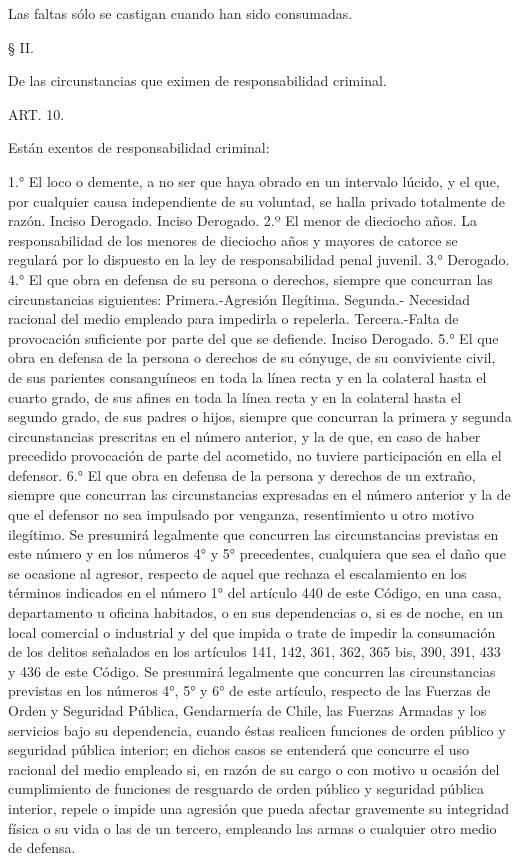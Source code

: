     Las faltas sólo se castigan cuando han sido consumadas.



    § II.

    De las circunstancias que eximen de responsabilidad criminal.


    ART. 10.

    Están exentos de responsabilidad criminal:

    1.° El loco o demente, a no ser que haya obrado en un intervalo lúcido, y el que, por cualquier causa independiente de su voluntad, se halla privado totalmente de razón.
    Inciso Derogado.
    Inciso Derogado.
    2.º El menor de dieciocho años. La responsabilidad de los menores de dieciocho años y mayores de catorce se regulará por lo dispuesto en la ley de responsabilidad penal juvenil.
    3.° Derogado.
    4.° El que obra en defensa de su persona o derechos, siempre que concurran las circunstancias siguientes:
    Primera.-Agresión Ilegítima.
    Segunda.- Necesidad racional del medio empleado para impedirla o repelerla.
    Tercera.-Falta de provocación suficiente por parte del que se defiende.
    Inciso Derogado.
    5.° El que obra en defensa de la persona o derechos de su cónyuge, de su conviviente civil, de sus parientes consanguíneos en toda la línea recta y en la colateral hasta el cuarto grado, de sus afines en toda la línea recta y en la colateral hasta el segundo grado, de sus padres o hijos, siempre que concurran la primera y segunda circunstancias prescritas en el número anterior, y la de que, en caso de haber precedido provocación de parte del acometido, no tuviere participación en ella el defensor.
    6.° El que obra en defensa de la persona y derechos de un extraño, siempre que concurran las circunstancias expresadas en el número anterior y la de que el defensor no sea impulsado por venganza, resentimiento u otro motivo ilegítimo.
    Se presumirá legalmente que concurren las circunstancias previstas en este número y en los números 4° y 5° precedentes, cualquiera que sea el daño que se ocasione al agresor, respecto de aquel que rechaza el escalamiento en los términos indicados en el número 1° del artículo 440 de este Código, en una casa, departamento u oficina habitados, o en sus dependencias o, si es de noche, en un local comercial o industrial y del que impida o trate de impedir la consumación de los delitos señalados en los artículos 141, 142, 361, 362, 365 bis, 390, 391, 433 y 436 de este Código.
    Se presumirá legalmente que concurren las circunstancias previstas en los números 4°, 5° y 6° de este artículo, respecto de las Fuerzas de Orden y Seguridad Pública, Gendarmería de Chile, las Fuerzas Armadas y los servicios bajo su dependencia, cuando éstas realicen funciones de orden público y seguridad pública interior; en dichos casos se entenderá que concurre el uso racional del medio empleado si, en razón de su cargo o con motivo u ocasión del cumplimiento de funciones de resguardo de orden público y seguridad pública interior, repele o impide una agresión que pueda afectar gravemente su integridad física o su vida o las de un tercero, empleando las armas o cualquier otro medio de defensa.
